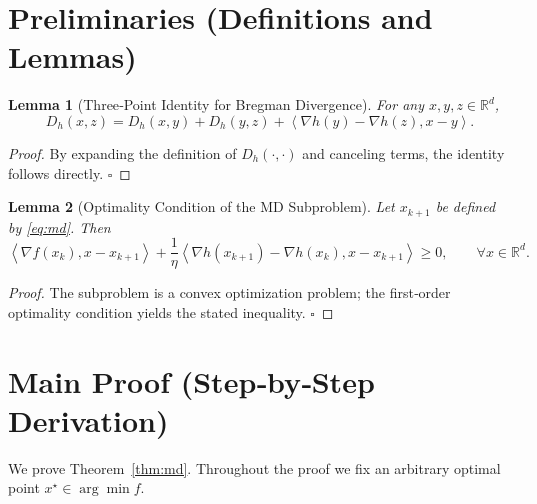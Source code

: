 \documentclass[11pt]{article}
\newtheorem{lemma}{Lemma}
\newcommand{\inner}[2]{\left\langle #1,#2\right\rangle}
\newcommand{\Breg}[2]{D_{h}(#1,#2)}
\newcommand{\grad}{\nabla}
\begin{document}
\section*{Preliminaries (Definitions and Lemmas)}
\begin{lemma}[Three‑Point Identity for Bregman Divergence]
\label{lem:threepoint}
For any $x,y,z\in\mathbb{R}^{d}$,
\[
\Breg{x}{z}= \Breg{x}{y}+\Breg{y}{z}
+\inner{\grad h(y)-\grad h(z)}{x-y}.
\]
\end{lemma}
\begin{proof}
By expanding the definition of $\Breg{\cdot}{\cdot}$ and canceling terms, the identity follows directly. \hfill $\square$
\end{proof}
\begin{lemma}[Optimality Condition of the MD Subproblem]
\label{lem:optcond}
Let $x_{k+1}$ be defined by \eqref{eq:md}. Then
\[
\inner{\grad f(x_k)}{x-x_{k+1}}+\frac{1}{\eta}
\inner{\grad h(x_{k+1})-\grad h(x_k)}{x-x_{k+1}}\ge 0,
\qquad\forall x\in\mathbb{R}^{d}.
\]
\end{lemma}
\begin{proof}
The subproblem is a convex optimization problem; the first‑order optimality condition yields the stated inequality. \hfill $\square$
\end{proof}

\section*{Main Proof (Step‑by‑Step Derivation)}
We prove Theorem~\ref{thm:md}. Throughout the proof we fix an arbitrary optimal point $x^{\star}\in\arg\min f$.
\end{document}
